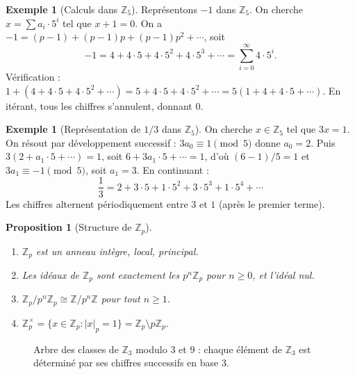 \documentclass[12pt,a4paper,openany]{book}
\theoremstyle{definition}
\newtheorem{exemple}[definition]{Exemple}
\theoremstyle{plain}
\newtheorem{proposition}[definition]{Proposition}
\theoremstyle{remark}
\newcommand{\Z}{\mathbb{Z}}
\newcommand{\abs}[1]{\left|#1\right|}
\begin{document}
\begin{exemple}[Calculs dans $\Z_5$]
\label{ex:calculs-Z5}
Représentons $-1$ dans $\Z_5$. On cherche $x = \sum a_i \cdot 5^i$ tel que $x + 1 = 0$.
On a $-1 = (p-1) + (p-1)p + (p-1)p^2 + \cdots$, soit
\[
  -1 = 4 + 4 \cdot 5 + 4 \cdot 5^2 + 4 \cdot 5^3 + \cdots = \sum_{i=0}^{\infty} 4 \cdot 5^i.
\]
Vérification : $1 + (4 + 4 \cdot 5 + 4 \cdot 5^2 + \cdots) = 5 + 4 \cdot 5 + 4 \cdot 5^2 + \cdots
= 5(1 + 4 + 4 \cdot 5 + \cdots)$. En itérant, tous les chiffres s'annulent,
donnant $0$.
\end{exemple}

\begin{exemple}[Représentation de $1/3$ dans $\Z_5$]
\label{ex:un-tiers-Z5}
On cherche $x \in \Z_5$ tel que $3x = 1$. On résout par développement successif :
$3 a_0 \equiv 1 \pmod{5}$ donne $a_0 = 2$. Puis $3(2 + a_1 \cdot 5 + \cdots) = 1$,
soit $6 + 3a_1 \cdot 5 + \cdots = 1$, d'où $(6-1)/5 = 1$ et $3a_1 \equiv -1 \pmod{5}$,
soit $a_1 = 3$. En continuant :
\[
  \frac{1}{3} = 2 + 3 \cdot 5 + 1 \cdot 5^2 + 3 \cdot 5^3 + 1 \cdot 5^4 + \cdots
\]
Les chiffres alternent périodiquement entre $3$ et $1$ (après le premier terme).
\end{exemple}

\begin{proposition}[Structure de $\Z_p$]
\label{prop:structure-Zp}
\begin{enumerate}[label=(\roman*)]
  \item $\Z_p$ est un anneau intègre, local, principal.
  \item Les idéaux de $\Z_p$ sont exactement les $p^n \Z_p$ pour $n \geq 0$, et
    l'idéal nul.
  \item $\Z_p / p^n \Z_p \cong \Z / p^n \Z$ pour tout $n \geq 1$.
  \item $\Z_p^{\times} = \{ x \in \Z_p : \abs{x}_p = 1 \} = \Z_p \setminus p\Z_p$.
\end{enumerate}
\end{proposition}


\begin{figure}[ht]
\centering
{}
\caption{Arbre des classes de $\Z_3$ modulo $3$ et $9$ :
chaque élément de $\Z_3$ est déterminé par ses chiffres successifs en base $3$.}
\label{fig:arbre-3-adique}
\end{figure}
\end{document}
